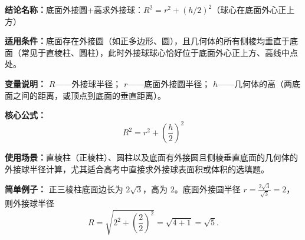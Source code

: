 \textbf{结论名称：}底面外接圆+高求外接球：\(R^2=r^2+(h/2)^2\)（球心在底面外心正上方）

\textbf{适用条件：}底面存在外接圆（如正多边形、圆），且几何体的所有侧棱均垂直于底面（常见于直棱柱、圆柱），此时外接球球心恰好位于底面外心正上方、高线中点处。

\textbf{变量说明：}
\(R\)——外接球半径；
\(r\)——底面外接圆半径；
\(h\)——几何体的高（两底面之间的距离，或顶点到底面的垂直距离）。

\textbf{核心公式：}
\[
\boxed{R^2 = r^2 + \left(\frac{h}{2}\right)^2}
\]

\textbf{使用场景：}直棱柱（正棱柱）、圆柱以及底面有外接圆且侧棱垂直底面的几何体的外接球半径计算，尤其适合高考中直接求外接球表面积或体积的选填题。

\textbf{简单例子：}
正三棱柱底面边长为 \(2\sqrt{3}\)，高为 \(2\)。底面外接圆半径 \(r=\frac{2\sqrt{3}}{\sqrt{3}}=2\)，则外接球半径
\[
R=\sqrt{2^2+\left(\frac{2}{2}\right)^2}=\sqrt{4+1}=\sqrt{5}.
\]